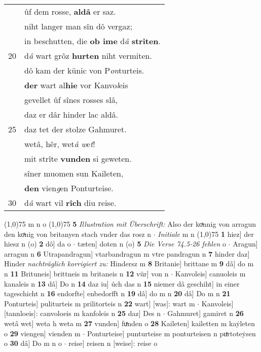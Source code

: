 \documentclass[8pt,a4paper,notitlepage]{article}
\begin{document}
\begin{table}[ht]
\begin{minipage}[t]{0.5\linewidth}
\begin{tabular}{rl}
 & ûf dem rosse, \textbf{aldâ} er saz.\\ 
 & niht langer man sîn dô vergaz;\\ 
 & in beschutten, die \textbf{ob ime} d\textit{â} \textbf{striten}.\\ 
20 & d\textit{â} wart grôz \textbf{hurten} niht vermiten.\\ 
 & dô kam der künic von P\textit{on}turteis.\\ 
 & \textbf{der} wart al\textbf{hie} vor Kanvo\textit{l}eis\\ 
 & gevellet ûf sînes rosses slâ,\\ 
 & daz er dâr hinder lac aldâ.\\ 
25 & daz tet der stolze Gahmuret.\\ 
 & wetâ, hêr, wet\textit{â} \textit{w}e\textit{t}!\\ 
 & mit strîte \textbf{vunden} si geweten.\\ 
 & sîner muomen sun Kaileten,\\ 
 & \textbf{den} vien\textit{g}en Ponturteise.\\ 
30 & d\textit{â} wart vil \textbf{rîch} diu reise.\\ 
\end{tabular}
\scriptsize
\line(1,0){75} \newline
m n o \newline
\line(1,0){75} \newline
\textbf{5} \textit{Illustration mit Überschrift:} Also der koͯnnig von arragun den koͯnig von britanyen stach vnder das rosz n   $\cdot$ \textit{Initiale} m n  \newline
\line(1,0){75} \newline
\textbf{1} hiez] der hiesz n (o) \textbf{2} dô] da o  $\cdot$ tæten] doten n (o) \textbf{5} \textit{Die Verse 74.5-26 fehlen} o   $\cdot$ Aragun] arragun n \textbf{6} Utrapandragun] vtarbandragun m vtre pandragun n \textbf{7} hinder daz] Hinder \textit{nachträglich korrigiert zu:} Hindersz m \textbf{8} Britanie] brittane m \textbf{9} dâ] do m n \textbf{11} Brituneis] brittneis m britaneis n \textbf{12} vür] von n  $\cdot$ Kanvoleis] canuoleis m kanaleis n \textbf{13} dâ] Do n \textbf{14} daz iu] úch das n \textbf{15} niemer dâ geschiht] in einer tageschicht n \textbf{16} endorfte] enbedorfft n \textbf{19} dâ] do m n \textbf{20} dâ] Do m n \textbf{21} Ponturteis] puliturteis m prilitorteis n \textbf{22} wart] [was]: wart m  $\cdot$ Kanvoleis] [tannloeis]: canvoloeis m kanfoleis n \textbf{25} daz] Des n  $\cdot$ Gahmuret] gamiret n \textbf{26} wetâ wet] weta h weta m \textbf{27} vunden] fuͯnden o \textbf{28} Kaileten] kailetten m kaẏleten o \textbf{29} viengen] vienden m  $\cdot$ Ponturteise] punturteise m ponturteisen n puͯrtoteẏsen o \textbf{30} dâ] Do m n o  $\cdot$ reise] reisen n [weise]: reise o \newline
\end{minipage}
\end{table}
\end{document}
